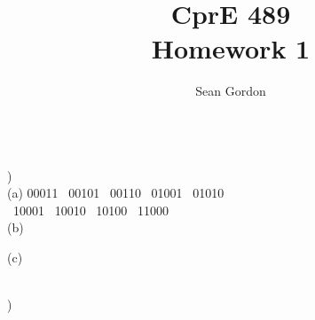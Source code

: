 \documentclass[12pt]{article}
\title{CprE 489\\Homework 1}
\author{Sean Gordon}
\begin{document}
\maketitle


\hrulefill \\


)\\
\indent (a) 00011 \ 00101 \ 00110 \ 01001 \ 01010 \\
\indent {} \ 10001 \ 10010 \ 10100 \ 11000\\

(b)\\
\indent \indent 

\indent \indent 

\indent (c) \\
\indent \indent 

\hrulefill \\


)\\
\end{document}
